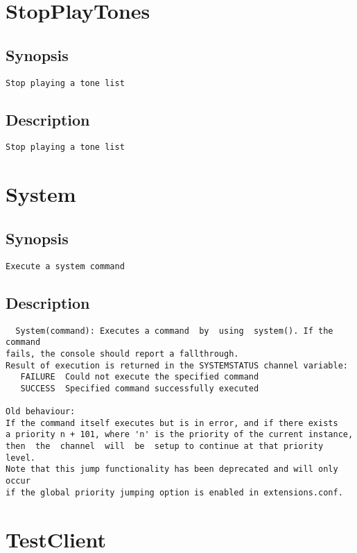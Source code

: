 \section{StopPlayTones}
\subsection{Synopsis}
\begin{verbatim}
Stop playing a tone list
\end{verbatim}
\subsection{Description}
\begin{verbatim}
Stop playing a tone list
\end{verbatim}


\section{System}
\subsection{Synopsis}
\begin{verbatim}
Execute a system command
\end{verbatim}
\subsection{Description}
\begin{verbatim}
  System(command): Executes a command  by  using  system(). If the command
fails, the console should report a fallthrough. 
Result of execution is returned in the SYSTEMSTATUS channel variable:
   FAILURE	Could not execute the specified command
   SUCCESS	Specified command successfully executed

Old behaviour:
If the command itself executes but is in error, and if there exists
a priority n + 101, where 'n' is the priority of the current instance,
then  the  channel  will  be  setup to continue at that priority level.
Note that this jump functionality has been deprecated and will only occur
if the global priority jumping option is enabled in extensions.conf.

\end{verbatim}


\section{TestClient}
